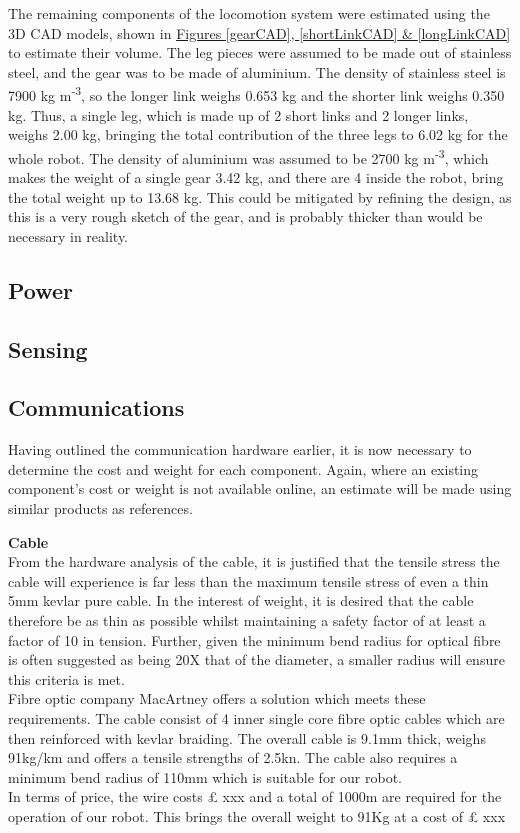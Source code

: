\documentclass[11pt]{article}		%
\newcommand{\supercite}[1]{\textsuperscript{\cite{#1}}}		%
\begin{document}
		The remaining components of the locomotion system were estimated using the 3D CAD models, shown in \hyperref[gearCAD]{Figures \ref*{gearCAD}, \ref*{shortLinkCAD} \& \ref*{longLinkCAD}} to estimate their volume.
		The leg pieces were assumed to be made out of stainless steel, and the gear was to be made of aluminium.
		The density of stainless steel is 7900 kg m\textsuperscript{-3}\supercite{HLT}, so the longer link weighs 0.653 kg and the shorter link weighs 0.350 kg.
		Thus, a single leg, which is made up of 2 short links and 2 longer links, weighs 2.00 kg, bringing the total contribution of the three legs to 6.02 kg for the whole robot.
		The density of aluminium was assumed to be 2700 kg m\textsuperscript{-3}\supercite{HLT}, which makes the weight of a single gear 3.42 kg, and there are 4 inside the robot, bring the total weight up to 13.68 kg.
		This could be mitigated by refining the design, as this is a very rough sketch of the gear, and is probably thicker than would be necessary in reality.
		
		\subsection{Power}
		
		\subsection{Sensing}

		\subsection{Communications}
		Having outlined the communication hardware earlier, it is now necessary to determine the cost and weight for each component. Again, where an existing component’s cost or weight is not available online, an estimate will be made using similar products as references. 
		
		\textbf{Cable}\\
		From the hardware analysis of the cable, it is justified that the tensile stress the cable will experience is far less than the maximum tensile stress of even a thin 5mm kevlar pure cable. In the interest of weight, it is desired that the cable therefore be as thin as possible whilst maintaining a safety factor of at least a factor of 10 in tension. Further, given the minimum bend radius for optical fibre is often suggested as being 20X that of the diameter, a smaller radius will ensure this criteria is met.\\
    	\hspace*{3ex}Fibre optic company MacArtney offers a solution which meets these requirements. The cable consist of 4 inner single core fibre optic cables which are then reinforced with kevlar braiding. The overall cable is 9.1mm thick, weighs 91kg/km and offers a tensile strengths of 2.5kn. The cable also requires a minimum bend radius of 110mm which is suitable for our robot. \\
    	\hspace*{3ex}In terms of price, the wire costs £ xxx and a total of 1000m are required for the operation of our robot. This brings the overall weight to 91Kg at a cost of £ xxx 
\end{document}
